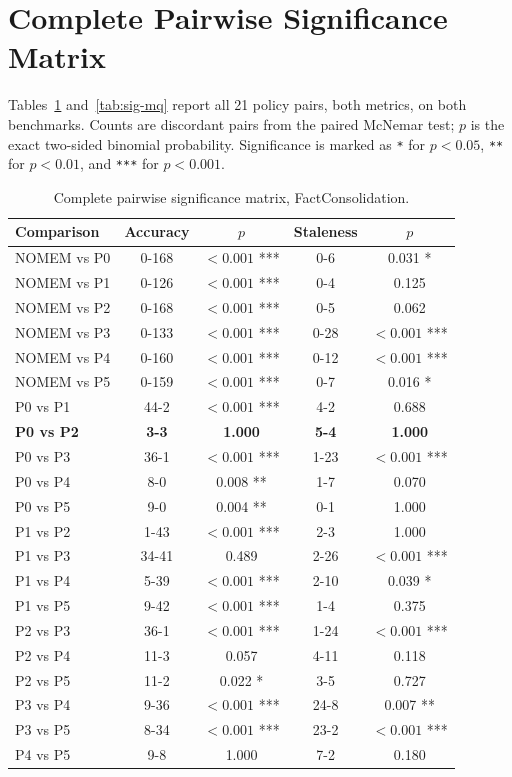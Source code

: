 \section{Complete Pairwise Significance Matrix}
\label{sec:appendix-significance}

Tables~\ref{tab:sig-fc} and~\ref{tab:sig-mq} report all 21 policy pairs, both metrics, on both benchmarks. Counts are discordant pairs from the paired McNemar test; $p$ is the exact two-sided binomial probability. Significance is marked as \texttt{*} for $p < 0.05$, \texttt{**} for $p < 0.01$, and \texttt{***} for $p < 0.001$.

\begin{table}[H]
\centering
\caption{Complete pairwise significance matrix, FactConsolidation.}
\label{tab:sig-fc}
\small
\setlength{\tabcolsep}{4pt}
\begin{tabular}{lcccc}
\toprule
Comparison & Accuracy & $p$ & Staleness & $p$ \\
\midrule
NOMEM vs P0 & 0-168 & $<0.001$ *** & 0-6 & 0.031 * \\
NOMEM vs P1 & 0-126 & $<0.001$ *** & 0-4 & 0.125 \\
NOMEM vs P2 & 0-168 & $<0.001$ *** & 0-5 & 0.062 \\
NOMEM vs P3 & 0-133 & $<0.001$ *** & 0-28 & $<0.001$ *** \\
NOMEM vs P4 & 0-160 & $<0.001$ *** & 0-12 & $<0.001$ *** \\
NOMEM vs P5 & 0-159 & $<0.001$ *** & 0-7 & 0.016 * \\
P0 vs P1 & 44-2 & $<0.001$ *** & 4-2 & 0.688 \\
\textbf{P0 vs P2} & \textbf{3-3} & \textbf{1.000} & \textbf{5-4} & \textbf{1.000} \\
P0 vs P3 & 36-1 & $<0.001$ *** & 1-23 & $<0.001$ *** \\
P0 vs P4 & 8-0 & 0.008 ** & 1-7 & 0.070 \\
P0 vs P5 & 9-0 & 0.004 ** & 0-1 & 1.000 \\
P1 vs P2 & 1-43 & $<0.001$ *** & 2-3 & 1.000 \\
P1 vs P3 & 34-41 & 0.489 & 2-26 & $<0.001$ *** \\
P1 vs P4 & 5-39 & $<0.001$ *** & 2-10 & 0.039 * \\
P1 vs P5 & 9-42 & $<0.001$ *** & 1-4 & 0.375 \\
P2 vs P3 & 36-1 & $<0.001$ *** & 1-24 & $<0.001$ *** \\
P2 vs P4 & 11-3 & 0.057 & 4-11 & 0.118 \\
P2 vs P5 & 11-2 & 0.022 * & 3-5 & 0.727 \\
P3 vs P4 & 9-36 & $<0.001$ *** & 24-8 & 0.007 ** \\
P3 vs P5 & 8-34 & $<0.001$ *** & 23-2 & $<0.001$ *** \\
P4 vs P5 & 9-8 & 1.000 & 7-2 & 0.180 \\
\bottomrule
\end{tabular}
\end{table}


